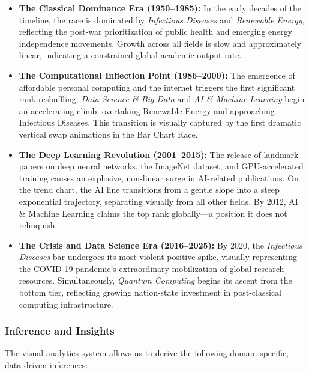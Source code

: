 \documentclass[12pt,a4paper]{article}
\begin{document}
\begin{itemize}
    \item \textbf{The Classical Dominance Era (1950--1985):} In the early decades of the
    timeline, the race is dominated by \textit{Infectious Diseases} and \textit{Renewable
    Energy}, reflecting the post-war prioritization of public health and emerging energy
    independence movements. Growth across all fields is slow and approximately linear,
    indicating a constrained global academic output rate.

    \item \textbf{The Computational Inflection Point (1986--2000):} The emergence of
    affordable personal computing and the internet triggers the first significant rank
    reshuffling. \textit{Data Science \& Big Data} and \textit{AI \& Machine Learning}
    begin an accelerating climb, overtaking Renewable Energy and approaching Infectious
    Diseases. This transition is visually captured by the first dramatic vertical swap
    animations in the Bar Chart Race.

    \item \textbf{The Deep Learning Revolution (2001--2015):} The release of landmark
    papers on deep neural networks, the ImageNet dataset, and GPU-accelerated training
    causes an explosive, non-linear surge in AI-related publications. On the trend chart,
    the AI line transitions from a gentle slope into a steep exponential trajectory,
    separating visually from all other fields. By 2012, AI \& Machine Learning claims
    the top rank globally---a position it does not relinquish.

    \item \textbf{The Crisis and Data Science Era (2016--2025):} By 2020, the
    \textit{Infectious Diseases} bar undergoes its most violent positive spike,
    visually representing the COVID-19 pandemic's extraordinary mobilization of global
    research resources. Simultaneously, \textit{Quantum Computing} begins its ascent
    from the bottom tier, reflecting growing nation-state investment in post-classical
    computing infrastructure.
\end{itemize}

\subsubsection{Inference and Insights}
The visual analytics system allows us to derive the following domain-specific, data-driven
inferences:
\end{document}

